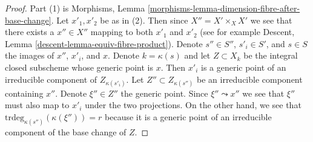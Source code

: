 \documentclass{stacks-project}
\theoremstyle{plain}
\theoremstyle{definition}
\theoremstyle{remark}
\numberwithin{equation}{subsection}
\begin{document}
\begin{proof}
Part (1) is
Morphisms, Lemma \ref{morphisms-lemma-dimension-fibre-after-base-change}.
Let $x'_1, x'_2$ be as in (2). Then since $X'' = X' \times_X X'$
we see that there
exists a $x'' \in X''$ mapping to both $x'_1$ and $x'_2$ (see for
example Descent, Lemma \ref{descent-lemma-equiv-fibre-product}).
Denote $s'' \in S''$, $s'_i \in S'$, and $s \in S$ the images
of $x''$, $x'_i$, and $x$.
Denote $k = \kappa(s)$ and let $Z \subset X_k$ be the integral
closed subscheme whose generic point is $x$. Then $x'_i$
is a generic point of an irreducible component of $Z_{\kappa(s'_i)}$.
Let $Z'' \subset Z_{\kappa(s'')}$ be an irreducible component
containing $x''$. Denote $\xi'' \in Z''$ the generic point.
Since $\xi'' \leadsto x''$ we see that $\xi''$ must also
map to $x'_i$ under the two projections. On the other hand,
we see that $\text{trdeg}_{\kappa(s'')}(\kappa(\xi'')) = r$
because it is a generic
point of an irreducible component of the base change of $Z$.
\end{proof}
\end{document}
